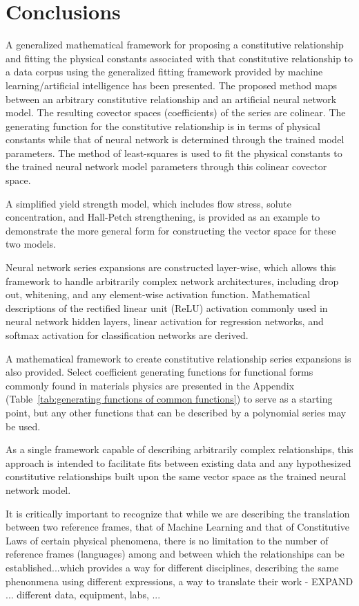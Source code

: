 \section{Conclusions}\label{conclusions}
A generalized mathematical framework for proposing a constitutive relationship and fitting the physical constants associated with that constitutive relationship to a data corpus using the generalized fitting framework provided by machine learning/artificial intelligence has been presented. The proposed method maps between an arbitrary constitutive relationship and an artificial neural network model. The resulting covector spaces (coefficients) of the series are colinear. The generating function for the constitutive relationship is in terms of physical constants while that of neural network is determined through the trained model parameters. The method of least-squares is used to fit the physical constants to the trained neural network model parameters through this colinear covector space.

A simplified yield strength model, which includes flow stress, solute concentration, and Hall-Petch strengthening, is provided as an example to demonstrate the more general form for constructing the vector space for these two models.

Neural network series expansions are constructed layer-wise, which allows this framework to handle arbitrarily complex network architectures, including drop out, whitening, and any element-wise activation function. Mathematical descriptions of the rectified linear unit (ReLU) activation commonly used in neural network hidden layers, linear activation for regression networks, and softmax activation for classification networks are derived.

A mathematical framework to create constitutive relationship series expansions is also provided. Select coefficient generating functions for functional forms commonly found in materials physics are presented in the Appendix (Table~\ref{tab:generating functions of common functions}) to serve as a starting point, but any other functions that can be described by a polynomial series may be used.

As a single framework capable of describing arbitrarily complex relationships, this approach is intended to facilitate fits between existing data and any hypothesized constitutive relationships built upon the same vector space as the trained neural network model.

{\color{red} It is critically important to recognize that while we are describing the translation between two reference frames, that of Machine Learning and that of Constitutive Laws of certain physical phenomena, there is no limitation to the number of reference frames (languages) among and between which the relationships can be established...which provides a way for different disciplines, describing the same phenonmena using different expressions, a way to translate their work - EXPAND ... different data, equipment, labs, ...}
